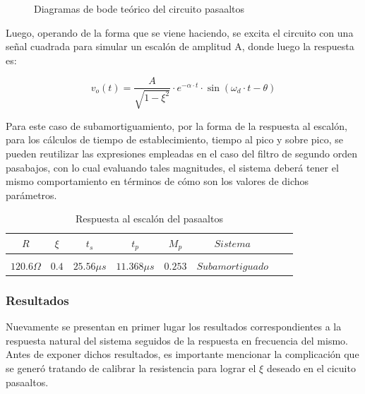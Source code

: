 \begin{figure}[H]
\begin{tabular}{c c}
    \end{tabular}
    \caption{Diagramas de bode te\'orico del circuito pasaaltos}
    \label{fig:bode_pasaaltos_teorico}
\end{figure}

Luego, operando de la forma que se viene haciendo, se excita el circuito con una se\~nal cuadrada para simular un escal\'on de amplitud A,
donde luego la respuesta es:

\begin{equation}
    v_o(t) = \frac{A}{\sqrt{1 - \xi^{2}}} \cdot e^{-\alpha \cdot t} \cdot \sin{(\omega_d \cdot t - \theta)}
\end{equation}

Para este caso de subamortiguamiento, por la forma de la respuesta al escal\'on, para los c\'alculos de tiempo de establecimiento,
tiempo al pico y sobre pico, se pueden reutilizar las expresiones empleadas en el caso del filtro de segundo orden pasabajos, con lo cual
evaluando tales magnitudes, el sistema deber\'a tener el mismo comportamiento en t\'erminos de c\'omo son los valores de dichos par\'ametros.

\begin{table}[H]
    \centering
    \begin{tabular}{c c c c c c c c}
        $R$ & $\xi$ & $t_s$ & $t_p$ & $M_p$ & $Sistema$ \\
        \hline \\
        $120.6 \Omega$ & $0.4$ & $25.56 \mu s$ & $11.368 \mu s$ & $0.253$ & $Subamortiguado$ \\
        \hline
    \end{tabular}
    \caption{Respuesta al escal\'on del pasaaltos}
    \label{tab:tabla_pasaaltos}
\end{table}

\subsubsection{Resultados}

Nuevamente se presentan en primer lugar los resultados correspondientes a la respuesta natural del sistema seguidos de la respuesta en frecuencia del mismo. Antes de exponer dichos resultados, es importante mencionar la complicación que se generó tratando de calibrar la resistencia para lograr el $\xi$ deseado en el cicuito pasaaltos. 

